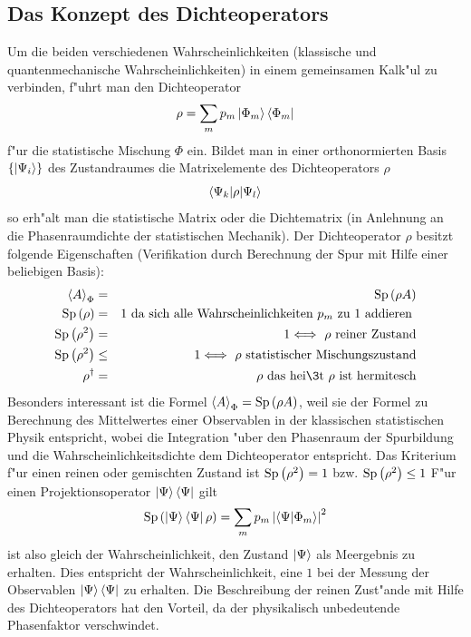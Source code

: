   \subsection{Das Konzept des Dichteoperators}
    Um die beiden verschiedenen Wahrscheinlichkeiten (klassische und quantenmechanische Wahrscheinlichkeiten) in einem gemeinsamen Kalk"ul zu verbinden, f"uhrt man
    den Dichteoperator
    $$ \rho = \sum_m p_m \left| \Phi_m \right>\left< \Phi_m \right| $$
    f"ur die statistische Mischung $\Phi$ ein. Bildet man in einer orthonormierten Basis $\left\{ \left| \Psi_i \right> \right\}$ des Zustandraumes \raum{} die
    Matrixelemente des Dichteoperators $\rho$ 
    $$ \left< \Psi_k | \rho | \Psi_l \right> $$
    so erh"alt man die statistische Matrix oder die Dichtematrix (in Anlehnung an die Phasenraumdichte der statistischen Mechanik). Der Dichteoperator $\rho$ besitzt folgende 
    Eigenschaften (Verifikation durch Berechnung der Spur mit Hilfe einer beliebigen Basis): 
    \begin{eqnarray*}
      \mean{A}_{\Phi} & = & \Spur{\rho A} \\
      \Spur{\rho} & = & 1 \mbox{ da sich alle Wahrscheinlichkeiten $p_m$ zu 1 addieren }\\
      \Spur{\rho ^2} & = & 1 \Longleftrightarrow \mbox{ $\rho$ reiner Zustand} \\
      \Spur{\rho ^2} & \le & 1 \Longleftrightarrow \mbox{ $\rho$ statistischer Mischungszustand} \\
      \rho^{\dag} & = & \rho \mbox{ das hei\3t $\rho$ ist hermitesch}
    \end{eqnarray*}
    Besonders interessant ist die Formel $\left< A \right>_{\Phi} = \mbox{Sp} \left( \rho A\right)$, weil sie der Formel zu Berechnung des Mittelwertes einer Observablen in der klassischen 
    statistischen Physik entspricht, wobei die Integration "uber den Phasenraum der Spurbildung und die Wahrscheinlichkeitsdichte dem Dichteoperator entspricht.     
    Das Kriterium f"ur einen reinen oder gemischten Zustand ist $\mbox{Sp} \left( \rho^2\right) = 1$ bzw. $\mbox{Sp} \left( \rho^2\right) \le 1$
    F"ur einen Projektionsoperator $\left| \Psi \right>\left< \Psi \right|$ gilt
    $$ \mbox{Sp} \left( \left| \Psi \right>\left< \Psi \right|\rho\right) = \sum_m p_m \left| \left< \Psi | \Phi_m \right> \right|^2 $$
    ist also gleich der Wahrscheinlichkeit, den Zustand $\left| \Psi \right>$ als Me\3ergebnis zu erhalten. Dies entspricht der Wahrscheinlichkeit, eine $1$ bei der Messung der Observablen
    $\left| \Psi \right>\left< \Psi \right|$ zu erhalten. Die Beschreibung der reinen Zust"ande mit Hilfe des Dichteoperators hat den Vorteil, da\3 der physikalisch unbedeutende Phasenfaktor verschwindet.
 
